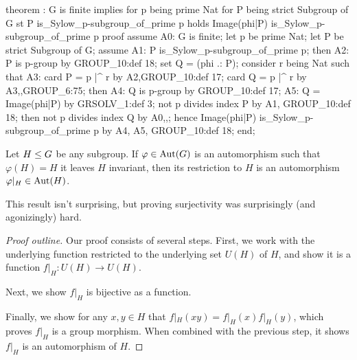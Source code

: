 \nwenddocs{}\endmoddef\nwstartdeflinemarkup{}\nwenddeflinemarkup
theorem :
  G is finite implies
  for p being prime Nat
  for P being strict Subgroup of G
  st P is_Sylow_p-subgroup_of_prime p
  holds Image(phi|P) is_Sylow_p-subgroup_of_prime p
proof
  assume A0: G is finite;
  let p be prime Nat;
  let P be strict Subgroup of G;
  assume A1: P is_Sylow_p-subgroup_of_prime p;
  then A2: P is p-group by GROUP_10:def 18;
  set Q = (phi .: P);
  consider r being Nat such that
  A3: card P = p |^ r
  by A2,GROUP_10:def 17;
  card Q = p |^ r by A3,,GROUP_6:75;
  then A4: Q is p-group by GROUP_10:def 17;
  A5: Q = Image(phi|P) by GRSOLV_1:def 3;
  not p divides index P by A1, GROUP_10:def 18;
  then not p divides index Q by A0,,;
  hence Image(phi|P) is_Sylow_p-subgroup_of_prime p by A4, A5, GROUP_10:def 18;
end;
\eatline
{}\nwendcode{}\nwdocspar
\begin{theorem}\label{thm:characteristic:automorphism:automorphism-which-leaves-subgroup-invariant-is-automorphism-of-subgroup}
  Let $H\leq G$ be any subgroup.
  If $\varphi\in\operatorname{Aut}(G)$ is an automorphism such that $\varphi(H)=H$ it
  leaves $H$ invariant, then its restriction to $H$ is an automorphism
  $\varphi|_{H}\in\operatorname{Aut}(H)$.
\end{theorem}

This result isn't surprising, but proving surjectivity was surprisingly
(and agonizingly) hard.

\begin{proof}[Proof outline]
  Our proof consists of several steps. First, we work with the
  underlying function restricted to the underlying set $U(H)$ of $H$, and show
  it is a function $f|_{H}\colon U(H)\to U(H)$.

  Next, we show $f|_{H}$ is bijective as a function.

  Finally, we show for any $x,y\in H$ that $f|_{H}(xy)=f|_{H}(x)f|_{H}(y)$,
  which proves $f|_{H}$ is a group morphism.
  When combined with the previous step, it shows $f|_{H}$ is an
  automorphism of $H$.
\end{proof}

